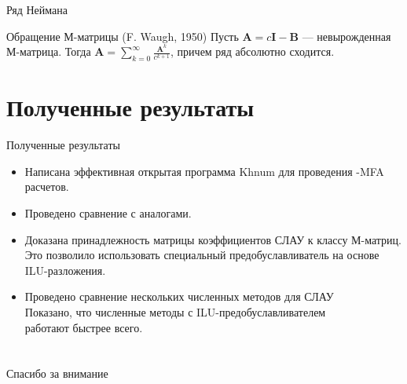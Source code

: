 \documentclass[aspectratio=169]{beamer}
\begin{document}
\begin{frame}{Ряд Неймана}
\begin{block}{Обращение М-матрицы (F. Waugh, 1950)}
	Пусть $\mathbf{A} = c\mathbf{I} - \mathbf{B}$ --- невырожденная М-матрица. Тогда $\mathbf{A} = \sum_{k = 0}^{\infty} \frac{\mathbf{A}^k}{c^{k+1}}$, причем ряд абсолютно сходится.
\end{block}
\end{frame}

\section{Полученные результаты}
\begin{frame}{Полученные результаты}
	\begin{itemize}
		\item Написана эффективная открытая программа Khnum для проведения -MFA расчетов.
		\item Проведено сравнение с аналогами.
		\item Доказана принадлежность матрицы коэффициентов СЛАУ к классу М-матриц. Это позволило использовать специальный предобуславливатель на основе ILU-разложения.
		\item Проведено сравнение нескольких численных методов для СЛАУ \\ Показано, что численные методы с ILU-предобуславливателем\\ работают быстрее всего.
	\end{itemize}
\end{frame}

\section*{}
\begin{frame}
	\centering
	\Large
	Спасибо за внимание
\end{frame}
\end{document}
